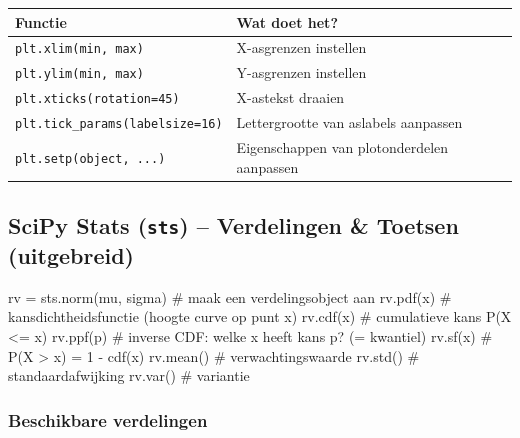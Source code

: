 \documentclass[a4paper,11pt]{article}
\begin{document}
\begin{center}
\renewcommand{\arraystretch}{1.3}
\begin{tabularx}{\linewidth}{@{}lX@{}}
\toprule
\textbf{Functie} & \textbf{Wat doet het?} \\
\midrule
\texttt{plt.xlim(min, max)} & X-asgrenzen instellen \\
\texttt{plt.ylim(min, max)} & Y-asgrenzen instellen \\
\texttt{plt.xticks(rotation=45)} & X-astekst draaien \\
\texttt{plt.tick\_params(labelsize=16)} & Lettergrootte van aslabels aanpassen \\
\texttt{plt.setp(object, ...)} & Eigenschappen van plotonderdelen aanpassen \\
\bottomrule
\end{tabularx}
\end{center}

\subsection{SciPy Stats (\texttt{sts}) -- Verdelingen \& Toetsen (uitgebreid)}

\begin{pyblock}
rv = sts.norm(mu, sigma)  # maak een verdelingsobject aan
rv.pdf(x)   # kansdichtheidsfunctie (hoogte curve op punt x)
rv.cdf(x)   # cumulatieve kans P(X <= x)
rv.ppf(p)   # inverse CDF: welke x heeft kans p? (= kwantiel)
rv.sf(x)    # P(X > x) = 1 - cdf(x)
rv.mean()   # verwachtingswaarde
rv.std()    # standaardafwijking
rv.var()    # variantie
\end{pyblock}

\subsubsection*{Beschikbare verdelingen}
\end{document}
